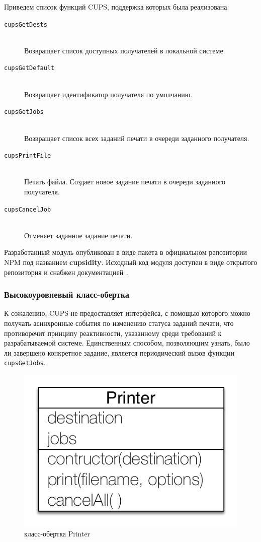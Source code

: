\documentclass[a4paper,14pt,href,draft]{article}
\begin{document}
Приведем список функций CUPS, поддержка которых была реализована:
\begin{description}
  \item[\texttt{cupsGetDests}] \hfill\\Возвращает список доступных получателей в локальной системе.
  \item[\texttt{cupsGetDefault}] \hfill\\Возвращает идентификатор получателя по умолчанию.
  \item[\texttt{cupsGetJobs}] \hfill\\Возвращает список всех заданий печати в очереди заданного получателя.
  \item[\texttt{cupsPrintFile}] \hfill\\Печать файла. Создает новое задание печати в очереди заданного получателя.
  \item[\texttt{cupsCancelJob}] \hfill\\Отменяет заданное задание печати.
\end{description}

Разработанный модуль опубликован в виде пакета в официальном репозитории NPM под названием \textbf{cupsidity}. Исходный
код модуля доступен в виде открытого репозитория и снабжен документацией~\cite{Cupsidity}.

\subsubsection{Высокоуровневый класс-обертка}
К сожалению, CUPS не предоставляет интерфейса, с помощью которого можно получать асинхронные события по изменению
статуса заданий печати, что противоречит принципу реактивности, указанному среди требований к разрабатываемой системе.
Единственным способом, позволяющим узнать, было ли завершено конкретное задание, является периодический вызов функции
\texttt{cupsGetJobs}.

\begin{figure}[htbp]
\begin{center}
  \includegraphics[scale=0.8]{printer-class.pdf}
    \caption{класс-обертка Printer}
    \label{fig:PrinterClass}
\end{center}
\end{figure}
\end{document}
